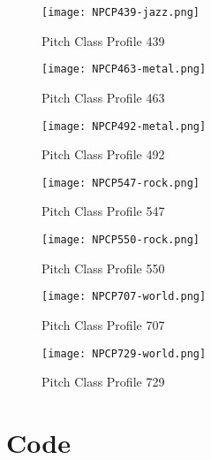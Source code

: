 \documentclass{article} %
\begin{document}
\begin{figure}[H]
\centering
\texttt{[image: NPCP439-jazz.png]}
\caption{Pitch Class Profile 439}
\label{fig:NPCP439_1}
\end{figure}

\begin{figure}[H]
\centering
\texttt{[image: NPCP463-metal.png]}
\caption{Pitch Class Profile 463}
\label{fig:NPCP463_1}
\end{figure}

\begin{figure}[H]
\centering
\texttt{[image: NPCP492-metal.png]}
\caption{Pitch Class Profile 492}
\label{fig:NPCP492_1}
\end{figure}

\begin{figure}[H]
\centering
\texttt{[image: NPCP547-rock.png]}
\caption{Pitch Class Profile 547}
\label{fig:NPCP547_1}
\end{figure}

\begin{figure}[H]
\centering
\texttt{[image: NPCP550-rock.png]}
\caption{Pitch Class Profile 550}
\label{fig:NPCP550_1}
\end{figure}

\begin{figure}[H]
\centering
\texttt{[image: NPCP707-world.png]}
\caption{Pitch Class Profile 707}
\label{fig:NPCP707_1}
\end{figure}

\begin{figure}[H]
\centering
\texttt{[image: NPCP729-world.png]}
\caption{Pitch Class Profile 729}
\label{fig:NPCP729_1}
\end{figure}
\clearpage

\clearpage
\section{Code}







 
 












\end{document}
